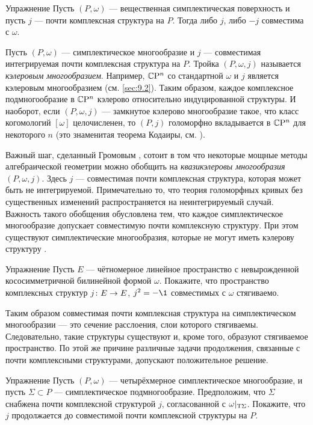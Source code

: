 \begin{ex}{Упражнение}\label{10.2.A}
Пусть $(P, \omega)$ — вещественная симплектическая
поверхность и пусть $j$ — почти комплексная структура на $P$. 
Тогда либо $j$, либо $-j$ совместима с $\omega$.
\end{ex}

Пусть $(P, \omega)$ — симплектическое многообразие и $j$ —
совместимая интегрируемая почти комплексная структура на $P$.
Тройка $(P, \omega, j)$ называется \emph{кэлеровым многообразием}.  
Например, $\mathbb{C}\mathrm{P}^n$ со стандартной $\omega$ и $j$ является кэлеровым
многообразием (см. \ref{sec:9.2}). 
Таким образом, каждое комплексное подмногообразие в $\mathbb{C}\mathrm{P}^n$ кэлерово
относительно индуцированной структуры. 
И наоборот, если $(P, \omega, j)$ — замкнутое кэлерово многообразие
такое, что класс когомологий $[\omega]$ целочисленен, то $(P, j)$
голоморфно вкладывается в $\mathbb{C}\mathrm{P}^n$ для некоторого $n$ (это знаменитая
теорема Кодаиры, см. \cite{GH}). 

Важный шаг, сделанный Громовым \cite{G1}, сотоит в том
что некоторые мощные методы алгебраической геометрии можно обобщить на
\emph{квазикэлеровы многообразия}
$(P, \omega, j)$. 
Здесь $j$ — совместимая почти комплексная структура, которая может
быть не интегрируемой. 
Примечательно то, что теория голоморфных кривых без существенных
изменений распространяется на неинтегрируемый случай. 
Важность такого обобщения обусловлена тем, что
каждое симплектическое многообразие допускает совместимую почти комплексную структуру.
При этом существуют симплектические многообразия, которые не могут иметь кэлерову структуру \cite{MS}.

\begin{ex}[\cite{MS}]{Упражнение}\label{10.2.B}
Пусть $E$ — чётномерное линейное пространство с невырожденной
кососимметричной билинейной формой $\omega$. 
Покажите, что пространство комплексных структур $j\: E \z\to E$, $j^2
= -\1$ совместимых с $\omega$ стягиваемо. 
\end{ex}

Таким образом совместимая почти комплексная структура на
симплектическом многообразии — это сечение расслоения, слои которого
стягиваемы. 
Следовательно, такие структуры существуют и, кроме того, образуют
стягиваемое пространство. 
По этой же причине различные задачи продолжения, связанные с почти
комплексными структурами, допускают положительное решение. 

\begin{ex}{Упражнение}\label{10.2.C}
Пусть $(P, \omega)$ — четырёхмерное симплектическое многообразие, и
пусть $\Sigma \subset P$ — симплектическое подмногообразие. 
Предположим, что $\Sigma$ снабжена почти комплексной структурой $j$,
согласованной с $\omega|_{\mathrm{T} \Sigma}$. 
Покажите, что $j$ продолжается до совместимой почти комплексной
структуры на $P$. 
\end{ex}


